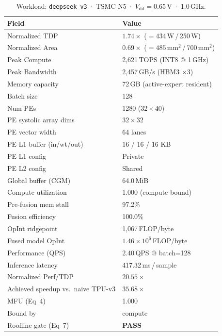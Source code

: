 \begin{table}[h]
\centering
\caption{Workload: \texttt{deepseek\_v3}~$\cdot$~TSMC N5~$\cdot$~$V_\text{dd}=0.65$\,V~$\cdot$~1.0\,GHz.}
\label{tab:cheetah_v2_deepseek_v3}
\small\setlength{\tabcolsep}{6pt}
\begin{tabular}{@{}ll@{}}
\toprule
\textbf{Field} & \textbf{Value} \\
\midrule
Normalized TDP          & $1.74\times$ ($= 434$\,W\,/\,250\,W) \\
Normalized Area         & $0.69\times$ ($= 485$\,mm$^2$\,/\,700\,mm$^2$) \\
Peak Compute            & 2{,}621\,TOPS (INT8 @ 1\,GHz) \\
Peak Bandwidth          & 2{,}457\,GB/s (HBM3 $\times$3) \\
Memory capacity         & 72\,GB (active-expert resident) \\
Batch size              & 128 \\
Num PEs                 & 1280 ($32 \times 40$) \\
PE systolic array dims  & $32 \times 32$ \\
PE vector width         & 64 lanes \\
PE L1 buffer (in/wt/out) & 16 / 16 / 16 KB \\
PE L1 config            & Private \\
PE L2 config            & Shared \\
Global buffer (CGM)     & 64.0\,MiB \\
\midrule
Compute utilization     & 1.000 (compute-bound) \\
Pre-fusion mem stall    & 97.2\% \\
Fusion efficiency       & 100.0\% \\
OpInt ridgepoint        & 1{,}067\,FLOP/byte \\
Fused model OpInt       & $1.46 \times 10^{6}$\,FLOP/byte \\
Performance (QPS)       & 2.40\,QPS @ batch=128 \\
Inference latency       & 417.32\,ms\,/\,sample \\
Normalized Perf/TDP     & $20.55\times$ \\
Achieved speedup vs.\ naive TPU-v3 & $35.68\times$ \\
MFU (Eq~4)              & 1.000 \\
Bound by                & compute \\
Roofline gate (Eq~7)    & \textcolor{green!60!black}{\textbf{PASS}} \\

\end{tabular}
\end{table}

